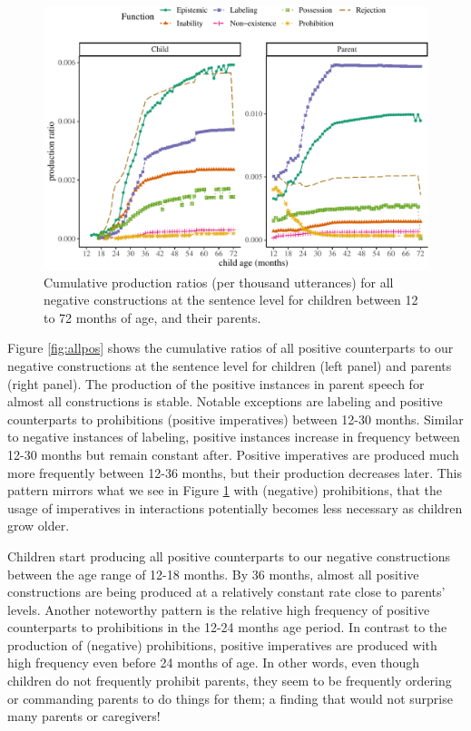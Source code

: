 \documentclass[
  man,floatsintext]{apa6}
\begin{document}
\begin{figure}[H]

{\centering \includegraphics{neg_construction_article_files/figure-latex/allneg-1} 

}

\caption{Cumulative production ratios (per thousand utterances) for all negative constructions at the sentence level for children between 12 to 72 months of age, and their parents.}\label{fig:allneg}
\end{figure}

Figure \ref{fig:allpos} shows the cumulative ratios of all positive counterparts to our negative constructions at the sentence level for children (left panel) and parents (right panel). The production of the positive instances in parent speech for almost all constructions is stable. Notable exceptions are labeling and positive counterparts to prohibitions (positive imperatives) between 12-30 months. Similar to negative instances of labeling, positive instances increase in frequency between 12-30 months but remain constant after. Positive imperatives are produced much more frequently between 12-36 months, but their production decreases later. This pattern mirrors what we see in Figure \ref{fig:allneg} with (negative) prohibitions, that the usage of imperatives in interactions potentially becomes less necessary as children grow older.

Children start producing all positive counterparts to our negative constructions between the age range of 12-18 months. By 36 months, almost all positive constructions are being produced at a relatively constant rate close to parents' levels. Another noteworthy pattern is the relative high frequency of positive counterparts to prohibitions in the 12-24 months age period. In contrast to the production of (negative) prohibitions, positive imperatives are produced with high frequency even before 24 months of age. In other words, even though children do not frequently prohibit parents, they seem to be frequently ordering or commanding parents to do things for them; a finding that would not surprise many parents or caregivers!
\end{document}
